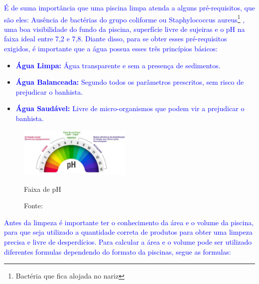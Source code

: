 
       \textcolor{blue}{É de suma importância que uma piscina limpa atenda a alguns pré-requisitos, que são eles: Ausência de bactérias do grupo coliforme ou Staphylococcus aureus\footnote{Bactéria que fica alojada no nariz} , uma boa visibilidade do fundo da piscina, superfície livre de sujeiras e o pH na faixa ideal entre 7,2 e 7,8. Diante disso, para se obter esses pré-requisitos exigidos, é importante que a água possua esses três princípios básicos:}
    
       \begin{itemize}
            \item \textbf{\textcolor{blue}{Água Limpa:}} \textcolor{blue}{Água transparente e sem a presença de sedimentos.}
            
            \item \textbf{\textcolor{blue}{Água Balanceada:}} \textcolor{blue}{Segundo todos os parâmetros prescritos, sem risco de prejudicar o banhista.}
             
            \item \textbf{\textcolor{blue}{Água Saudável:}} \textcolor{blue}{Livre de micro-organismos que podem vir a prejudicar o banhista.}
            
        \end{itemize}

        \begin{figure}[H]
                \centering
                \caption{ }  
            	\centering
                \label{fig:cont}
            	\includegraphics[width=0.48\textwidth]{imagens/medidorPh.png}
                \caption*{Faixa de pH}
            	\caption*{Fonte: \cite{guiaTratamento}}
        \end{figure}


        \textcolor{blue}{Antes da limpeza é importante ter o conhecimento da área e o volume da piscina, para que seja utilizado a quantidade correta de produtos para obter uma limpeza precisa e livre de desperdícios. Para calcular a área e o volume pode ser utilizado diferentes formulas dependendo do formato da piscinas, segue as formulas:}

